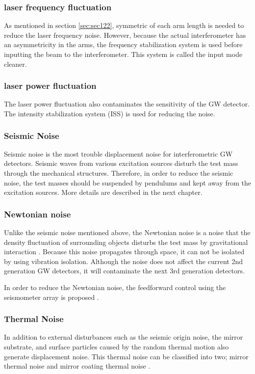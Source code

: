 \subsubsection{laser frequency fluctuation}
As mentioned in section \ref{sec:sec122}, symmetric of each arm length is needed to reduce the laser frequency noise. However, because the actual interferometer has an asymmetricity in the arms, the frequency stabilization system is used before inputting the beam to the interferometer. This system is called the input mode cleaner.

\subsubsection{laser power fluctuation}
The laser power fluctuation also contaminates the sensitivity of the GW detector. The intensity stabilization system (ISS) is used for reducing the noise.

\subsubsection{Seismic Noise}
Seismic noise is the most trouble displacement noise for interferometric GW detectors. Seismic waves from various excitation sources disturb the test mass through the mechanical structures. Therefore, in order to reduce the seismic noise, the test masses should be suspended by pendulums and kept away from the excitation sources. More details are described in the next chapter.

\subsubsection{Newtonian noise}
Unlike the seismic noise mentioned above, the Newtonian noise is a noise that the density fluctuation of surrounding objects disturbs the test mass by gravitational interaction \cite{harms2015terrestrial}. Because this noise propagates through space, it can not be isolated by using vibration isolation. Although the noise does not affect the current 2nd generation GW detectors, it will contaminate the next 3rd generation detectors.

In order to reduce the Newtonian noise, the feedforward control using the seismometer array is proposed \cite{driggers2015noise}.

\subsubsection{Thermal Noise}
In addition to external disturbances such as the seismic origin noise, the mirror substrate, and surface particles caused by the random thermal motion also generate displacement noise. This thermal noise can be classified into two; mirror thermal noise and mirror coating thermal noise \cite{dan2016study}.


